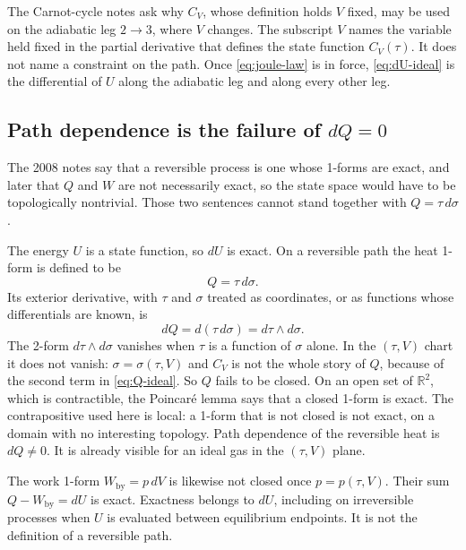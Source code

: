 The Carnot-cycle notes ask why \(C_V\), whose definition holds \(V\) fixed, may be used on the adiabatic leg \(2\to 3\), where \(V\) changes. The subscript \(V\) names the variable held fixed in the partial derivative that defines the state function \(C_V(\tau)\). It does not name a constraint on the path. Once \eqref{eq:joule-law} is in force, \eqref{eq:dU-ideal} is the differential of \(U\) along the adiabatic leg and along every other leg.

\subsection{Path dependence is the failure of \(dQ=0\)}
\label{sec:not-topology}

The 2008 notes say that a reversible process is one whose 1-forms are exact, and later that \(Q\) and \(W\) are not necessarily exact, so the state space would have to be topologically nontrivial. Those two sentences cannot stand together with \(Q = \tau\, d\sigma\).

The energy \(U\) is a state function, so \(dU\) is exact. On a reversible path the heat 1-form is defined to be
\begin{equation}
\label{eq:Q-reversible}
Q = \tau\, d\sigma.
\end{equation}
Its exterior derivative, with \(\tau\) and \(\sigma\) treated as coordinates, or as functions whose differentials are known, is
\begin{equation}
\label{eq:dQ}
dQ = d(\tau\, d\sigma) = d\tau\wedge d\sigma.
\end{equation}
The 2-form \(d\tau\wedge d\sigma\) vanishes when \(\tau\) is a function of \(\sigma\) alone. In the \((\tau,V)\) chart it does not vanish: \(\sigma = \sigma(\tau,V)\) and \(C_V\) is not the whole story of \(Q\), because of the second term in \eqref{eq:Q-ideal}. So \(Q\) fails to be closed. On an open set of \(\mathbb{R}^2\), which is contractible, the Poincaré lemma says that a closed 1-form is exact. The contrapositive used here is local: a 1-form that is not closed is not exact, on a domain with no interesting topology. Path dependence of the reversible heat is \(dQ\neq 0\). It is already visible for an ideal gas in the \((\tau,V)\) plane.

The work 1-form \(W_{\mathrm{by}} = p\, dV\) is likewise not closed once \(p = p(\tau,V)\). Their sum \(Q - W_{\mathrm{by}} = dU\) is exact. Exactness belongs to \(dU\), including on irreversible processes when \(U\) is evaluated between equilibrium endpoints. It is not the definition of a reversible path.

